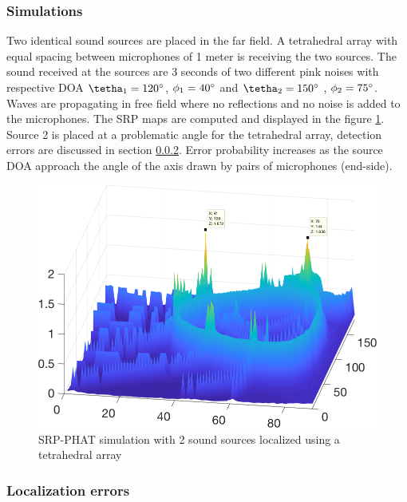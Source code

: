 \subsubsection{Simulations}

Two identical sound sources are placed in the far field. A tetrahedral array with equal spacing between microphones of 1 meter is receiving the two sources. The sound received at the sources are 3 seconds of two different pink noises with respective DOA $\tetha_{1}=120\degree$, $\phi_{1}=40\degree $ and $\tetha_{2}=150\degree $ , $\phi_{2}=75\degree $. Waves are propagating in free field where no reflections and no noise is added to the microphones. The SRP maps are computed and displayed in the figure \ref{fig:coherent2pinknoise}. Source 2 is placed at a problematic angle for the tetrahedral array, detection errors are discussed in section \ref{sec:detection}. Error probability increases as the source DOA approach the angle of the axis drawn by pairs of microphones (end-side).

\begin{figure}[H]
    \centering
    \includegraphics[width=1\textwidth]{Figures/2pinknoisesrpphat.png}
    \caption{SRP-PHAT simulation with 2 sound sources localized using a tetrahedral array}
    \label{fig:coherent2pinknoise}
\end{figure}



\subsubsection{Localization errors} \label{sec:detection}


